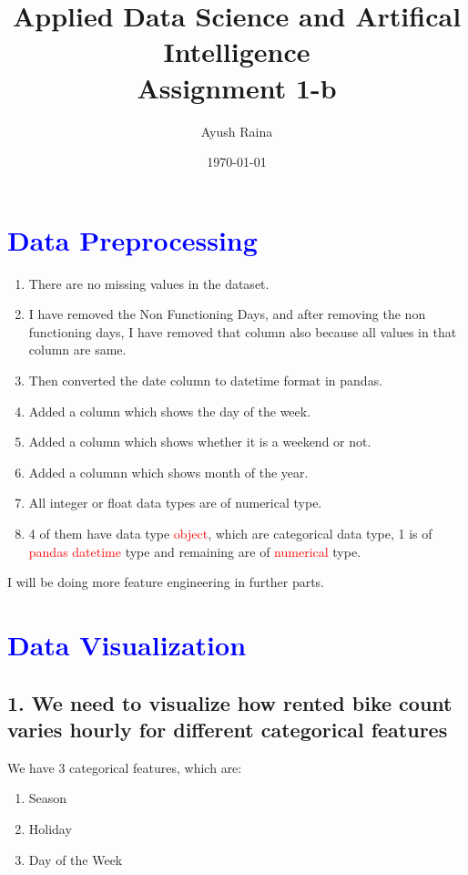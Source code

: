 \documentclass[12pt, letterpaper]{article}
\title{Applied Data Science and Artifical Intelligence \\ Assignment 1-b}
\author{Ayush Raina}
\date{\today}
\begin{document}
\maketitle
\large

\section*{\textcolor{blue}{Data Preprocessing}}
\begin{enumerate}
  \item There are no missing values in the dataset.
  \item I have removed the Non Functioning Days, and after removing the non functioning days, I have removed that column also because all values in that column are same.
  \item Then converted the date column to datetime format in pandas.
  \item Added a column which shows the day of the week.
  \item Added a column which shows whether it is a weekend or not.
  \item Added a columnn which shows month of the year.
  \item All integer or float data types are of numerical type.
  \item 4 of them have data type \textcolor{red}{object}, which are categorical data type, 1 is of \textcolor{red}{pandas datetime} type and remaining are of \textcolor{red}{numerical} type.
\end{enumerate}

I will be doing more feature engineering in further parts.

\section*{\textcolor{blue}{Data Visualization}}

\subsection*{1. We need to visualize how rented bike count varies hourly for different categorical features}

We have 3 categorical features, which are:
\begin{enumerate}
  \item Season
  \item Holiday
  \item Day of the Week
\end{enumerate}
\end{document}
